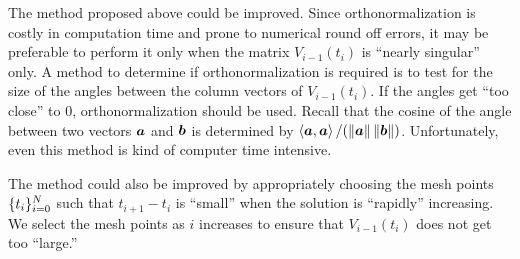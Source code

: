 \begin{rmk}
The method proposed above could be improved.  Since orthonormalization
is costly in computation time and prone to numerical round off errors,
it may be preferable to perform it only when the matrix $V_{i-1}(t_i)$ is
``nearly singular'' only.  A method to determine if orthonormalization
is required is to test for the size of the angles between the column
vectors of $V_{i-1}(t_i)$.  If the angles get ``too close'' to $0$,
orthonormalization should be used.  Recall that the cosine of the
angle between two vectors $\bm{a}$ and $\bm{b}$ is determined by
$\left\langle{\bm{a}} , {\bm{a}}\right\rangle / (\|\bm{a}\|\,\|\bm{b}\|)$.  Unfortunately,
even this method is kind of computer time intensive.

The method could also be improved by appropriately choosing the mesh
points $\displaystyle \{t_i\}_{i=0}^N$ such that $t_{i+1}-t_i$ is
``small'' when the solution is ``rapidly'' increasing.  We select the
mesh points as $i$ increases to ensure that $V_{i-1}(t_i)$ does not
get too ``large.''
\end{rmk}

